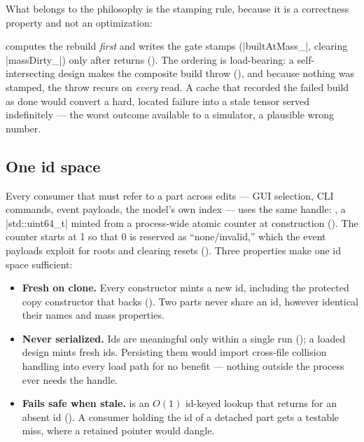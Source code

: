 What belongs to the philosophy is the stamping rule, because it is a correctness property and
not an optimization:

\begin{keyinsight}
 computes the rebuild \emph{first} and writes the gate stamps
(\cppinline|builtAtMass_|, clearing \cppinline|massDirty_|) only after
 returns (). The ordering is
load-bearing: a self-intersecting design makes the composite build throw
(), and because nothing was stamped, the throw recurs on
\emph{every} read. A cache that recorded the failed build as done would convert a hard,
located failure into a stale tensor served indefinitely --- the worst outcome available to a
simulator, a plausible wrong number.
\end{keyinsight}

\subsection{One id space}\label{sec:philosophy-id}

Every consumer that must refer to a part across edits --- GUI selection, CLI commands, event
payloads, the model's own index --- uses the same handle: , a
\cppinline|std::uint64_t| minted from a process-wide atomic counter at construction
(). The counter starts at 1 so that 0 is reserved as
``none/invalid,'' which the event payloads exploit for roots and clearing resets
(). Three properties make one id space sufficient:

\begin{itemize}
  \item \textbf{Fresh on clone.} Every constructor mints a new id, including the protected
  copy constructor that backs  (). Two parts
  never share an id, however identical their names and mass properties.
  \item \textbf{Never serialized.} Ids are meaningful only within a single run
  (); a loaded design mints fresh ids. Persisting them
  would import cross-file collision handling into every load path for no benefit --- nothing
  outside the process ever needs the handle.
  \item \textbf{Fails safe when stale.}  is an $O(1)$ id-keyed lookup
  that returns  for an absent id (). A
  consumer holding the id of a detached part gets a testable miss, where a retained pointer
  would dangle.
\end{itemize}

